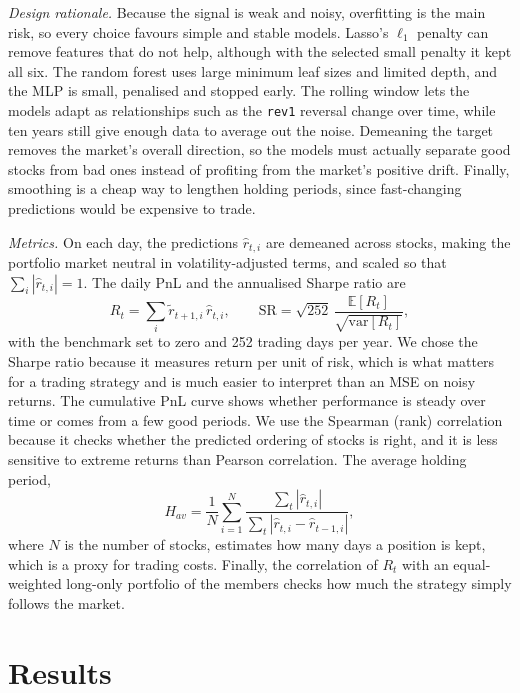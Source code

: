 \documentclass[conference]{IEEEtran}
\begin{document}
\textit{Design rationale.} Because the signal is weak and noisy, overfitting is the main risk, so every choice favours simple and stable models. Lasso's $\ell_1$ penalty can remove features that do not help, although with the selected small penalty it kept all six. The random forest uses large minimum leaf sizes and limited depth, and the MLP is small, penalised and stopped early. The rolling window lets the models adapt as relationships such as the \texttt{rev1} reversal change over time, while ten years still give enough data to average out the noise. Demeaning the target removes the market's overall direction, so the models must actually separate good stocks from bad ones instead of profiting from the market's positive drift. Finally, smoothing is a cheap way to lengthen holding periods, since fast-changing predictions would be expensive to trade.

\textit{Metrics.} On each day, the predictions $\hat r_{t,i}$ are demeaned across stocks, making the portfolio market neutral in volatility-adjusted terms, and scaled so that $\sum_i|\hat r_{t,i}|=1$. The daily PnL and the annualised Sharpe ratio are
\begin{equation}
R_t=\sum_i\tilde r_{t+1,i}\,\hat r_{t,i},\qquad \mathrm{SR}=\sqrt{252}\,\frac{\mathbb{E}[R_t]}{\sqrt{\mathrm{var}[R_t]}},
\label{eq:sharpe}
\end{equation}
with the benchmark set to zero and 252 trading days per year. We chose the Sharpe ratio because it measures return per unit of risk, which is what matters for a trading strategy and is much easier to interpret than an MSE on noisy returns. The cumulative PnL curve shows whether performance is steady over time or comes from a few good periods. We use the Spearman (rank) correlation because it checks whether the predicted ordering of stocks is right, and it is less sensitive to extreme returns than Pearson correlation. The average holding period,
\begin{equation}
H_{av}=\frac{1}{N}\sum_{i=1}^{N}\frac{\sum_{t}|\hat r_{t,i}|}{\sum_{t}|\hat r_{t,i}-\hat r_{t-1,i}|},
\label{eq:hold}
\end{equation}
where $N$ is the number of stocks, estimates how many days a position is kept, which is a proxy for trading costs. Finally, the correlation of $R_t$ with an equal-weighted long-only portfolio of the members checks how much the strategy simply follows the market.

\section{Results}
\end{document}
